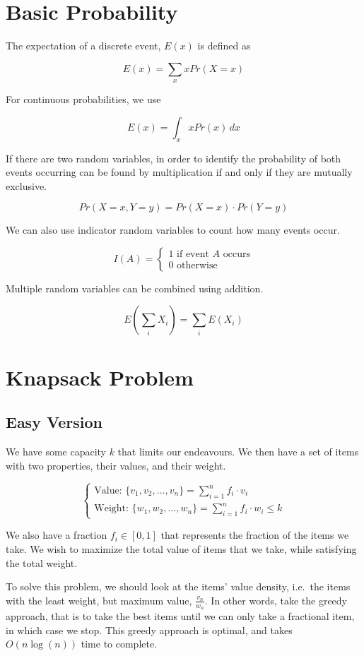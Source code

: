 \documentclass[10pt]{article}
\begin{document}
\section{Basic Probability}
The expectation of a discrete event, $E(x)$ is defined as

    \[ E(x) = \sum_x x Pr(X = x) \]

For continuous probabilities, we use

    \[ E(x) = \int_x x Pr(x) \, dx \]

If there are two random variables, in order to identify the probability of both events occurring can be found by multiplication if and only if they are mutually exclusive.

    \[ Pr(X=x, Y=y) = Pr(X=x) \cdot Pr(Y=y) \]

We can also use indicator random variables to count how many events occur.

    \[ I(A) = \begin{cases}1 \text{ if event $A$ occurs}\\0 \text{ otherwise}\end{cases} \]

Multiple random variables can be combined using addition.

    \[ E \left( \sum_i X_i \right) = \sum_i E(X_i) \]

\section{Knapsack Problem}
    \subsection{Easy Version}
    We have some capacity $k$ that limits our endeavours. We then have a set of items with two properties, their values,
    and their weight.

    \[ \begin{cases}
        \text{Value: } \{ v_1, v_2, \ldots, v_n \} = \sum^n_{i=1} f_i \cdot v_i\\
        \text{Weight: } \{ w_1, w_2, \ldots, w_n \} = \sum^n_{i=1} f_i \cdot w_i \le k
    \end{cases} \]

    We also have a fraction $f_i \in [0,1]$ that represents the fraction of the items we take. We wish to maximize the
    total value of items that we take, while satisfying the total weight.

    To solve this problem, we should look at the items' value density, i.e.\ the items with the least weight, but
    maximum value, $\frac{v_n}{w_n}$. In other words, take the greedy approach, that is to take the best items until we
    can only take a fractional item, in which case we stop. This greedy approach is optimal, and takes $O(n \log(n))$
    time to complete.
\end{document}
